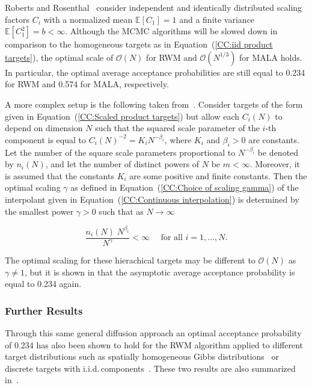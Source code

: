 Roberts and Rosenthal~\autocite{Roberts2001} consider independent and identically distributed scaling factors $C_i$ with a normalized mean $\mathbb{E}[C_1] = 1$ and a finite variance $ \mathbb{E}[C_1^2] = b < \infty $. Although the MCMC algorithms will be slowed down in comparison to the homogeneous targets as in Equation~(\ref{CC:iid product targets}), the optimal scale of $\mathcal{O}(N)$ for RWM and $ \mathcal{O}(N^{1/3}) $ for MALA holds. In particular, the optimal average acceptance probabilities are still equal to 0.234 for RWM and 0.574 for MALA, respectively.


A more complex setup is the following taken from~\autocite{Bedard2007}. Consider targets of the form given in Equation~(\ref{CC:Scaled product targets}) but allow each $C_i(N)$ to depend on dimension $N$ such that the squared scale parameter of the $i$-th component is equal to $ C_i(N)^{-2} = K_i  N^{-\beta_i} $, where $K_i$ and $\beta_i>0$ are constants. Let the number of the square scale parameters proportional to $N^{-\beta_i}$ be denoted by $ n_i(N) $, and let the number of distinct powers of $N$ be $m<\infty$. Moreover, it is assumed that the constants $K_i$ are some positive and finite constants. Then the optimal scaling $\gamma$ as defined in Equation~(\ref{CC:Choice of scaling gamma}) of the interpolant given in Equation~(\ref{CC:Continuous interpolation}) is determined by the smallest power $ \gamma > 0 $ such that as $N \to \infty$ 

\begin{equation}
 \frac{n_i(N) \; N^{\beta_i}}{N^{\gamma}} < \infty \quad \text{ for all } i = 1, \dots, N.
\end{equation}

The optimal scaling for these hierachical targets may be different to $\mathcal{O}(N)$ as $ \gamma \neq 1 $, but it is shown in \autocite{Bedard2007} that the asymptotic average acceptance probability is equal to 0.234 again.

\subsubsection{Further Results}

Through this same general diffusion approach an optimal acceptance probability of 0.234 has also been shown to hold for the RWM algorithm applied to different target distributions such as spatially homogeneous Gibbs distributions~\autocite{Breyer2000} or discrete targets with i.i.d.\,components~\autocite{Roberts1998-2}.  These two results are also summarized in~\autocite{Roberts2001}.

